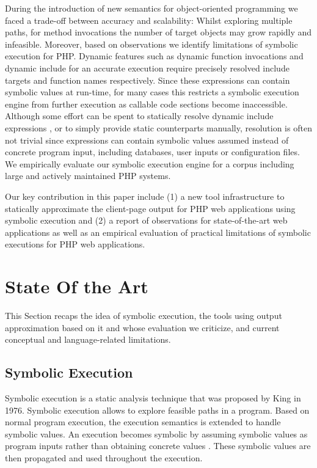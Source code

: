 \documentclass[sigconf, preprint]{acmart}
\begin{document}
During the introduction of new semantics for object-oriented programming we
faced a trade-off between accuracy and scalability: Whilst exploring multiple
paths, for method invocations the number of target objects may grow rapidly and
infeasible. Moreover, based on observations we identify limitations of symbolic execution
for PHP. Dynamic features such as dynamic function invocations and dynamic
include for an accurate execution require precisely resolved include targets
and function names respectively. Since these expressions  can contain symbolic
values at run-time, for many cases this restricts a symbolic execution engine
from further execution as callable code sections become inaccessible.
Although some effort can be spent to statically resolve dynamic include
expressions \cite{hills2014static}, or to simply provide static counterparts manually, resolution
is often not trivial since expressions can contain symbolic values assumed instead
of concrete program input, including databases, user inputs or configuration
files. We empirically evaluate our symbolic execution engine for a corpus
including large and actively maintained PHP systems.

Our key contribution in this paper include (1) a new tool infrastructure to
statically approximate the client-page output for PHP web applications using
symbolic execution and (2) a report of observations for state-of-the-art
web applications as well as an empirical evaluation of practical limitations
of symbolic executions for PHP web applications.

\section{State Of the Art}\label{sec:stateoftheart}
This Section recaps the idea of symbolic
execution, the tools using output approximation based on it and whose evaluation
we criticize, and current conceptual and language-related limitations.

\subsection{Symbolic Execution}
Symbolic execution is a static analysis technique that was proposed by King
\cite{King1976} in 1976. Symbolic execution allows to explore feasible paths in
a program. Based on normal program execution, the execution semantics is
extended to handle symbolic values. An execution becomes symbolic by assuming
symbolic values as program inputs rather than obtaining concrete values
\cite{King1976,Darringer1978}. These symbolic values are then propagated and
used throughout the execution.
\end{document}
